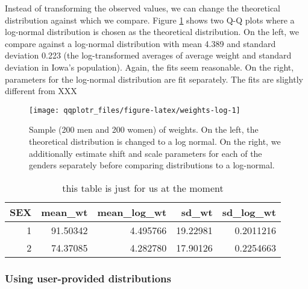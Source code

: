 Instead of transforming the observed values, we can change the
theoretical distribution against which we compare. Figure
\ref{fig:weights-log} shows two Q-Q plots where a log-normal
distribution is chosen as the theoretical distribution. On the left, we
compare against a log-normal distribution with mean 4.389 and standard
deviation 0.223 (the log-transformed averages of average weight and
standard deviation in Iowa's population). Again, the fits seem
reasonable. On the right, parameters for the log-normal distribution are
fit separately. The fits are slightly different from XXX

\begin{Schunk}
\begin{figure}

{\centering \texttt{[image: qqplotr\_files/figure-latex/weights-log-1]} 

}

\caption[Sample (200 men and 200 women) of weights]{Sample (200 men and 200 women) of weights. On the left, the theoretical distribution  is changed to a log normal. On the right, we additionally estimate shift and scale parameters for each of the genders separately before comparing distributions to a log-normal.}\label{fig:weights-log}
\end{figure}
\end{Schunk}

\begin{table}

\caption{\label{tab:table}this table is just for us at the moment}
\centering
\begin{tabular}[t]{r|r|r|r|r}
\hline
SEX & mean\_wt & mean\_log\_wt & sd\_wt & sd\_log\_wt\\
\hline
1 & 91.50342 & 4.495766 & 19.22981 & 0.2011216\\
\hline
2 & 74.37085 & 4.282780 & 17.90126 & 0.2254663\\
\hline
\end{tabular}
\end{table}

\subsubsection{Using user-provided
distributions}\label{using-user-provided-distributions}

\label{sec:user-dists}

